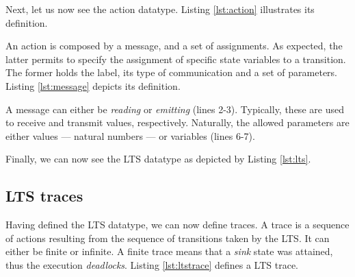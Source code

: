 	Next, let us now see the \textsf{action} datatype. Listing \ref{lst:action} illustrates its definition.
	
			

	\noindent An \textsf{action} is composed by a \textsf{message}, and a set of \textsf{assignments}.
	As expected, the latter permits to specify the assignment of specific state variables to a \textsf{transition}.
	The former holds the label, its type of communication and a set of parameters. Listing \ref{lst:message}
	depicts its definition.
	
				

	\noindent A message can either be \textit{reading} or \textit{emitting} (lines 2-3). Typically, these
	are used to receive and transmit values, respectively. Naturally, the allowed \textsf{parameters} are
	either values --- natural numbers --- or variables (lines 6-7).
	
	
	Finally, we can now see the \textsf{LTS} datatype as depicted by Listing \ref{lst:lts}.	
		
		


\subsection{LTS traces}
\label{sub:ltstrace}


	Having defined the \textsf{LTS} datatype, we can now define \textsf{traces}. A trace is a sequence of actions 
	resulting from the sequence of \textsf{transitions} taken by the \textsf{LTS}. It can either be finite or
	infinite. A finite trace means that a \textit{sink} state was attained, thus the execution \textit{deadlocks}.
	Listing \ref{lst:ltstrace} defines a \textsf{LTS} trace.	
	
	
			


